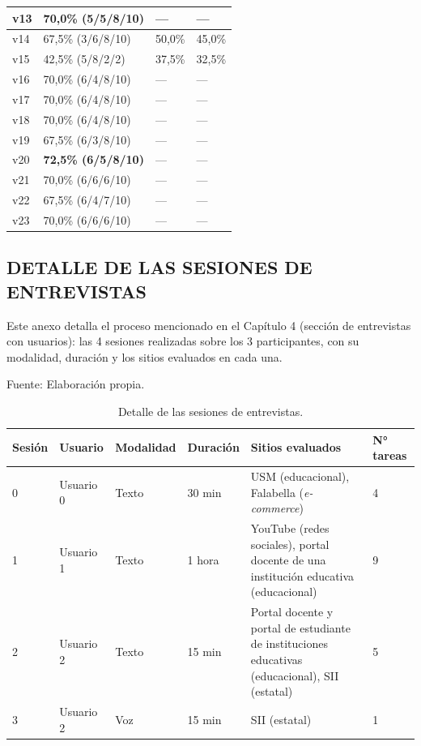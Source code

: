 \begin{longtable}{|p{1.5cm}|p{5cm}|p{2.8cm}|p{2.8cm}|}
    \hline
    v13 & 70,0\% (5/5/8/10) & — & — \\
    \hline
    v14 & 67,5\% (3/6/8/10) & 50,0\% & 45,0\% \\
    \hline
    v15 & 42,5\% (5/8/2/2) & 37,5\% & 32,5\% \\
    \hline
    v16 & 70,0\% (6/4/8/10) & — & — \\
    \hline
    v17 & 70,0\% (6/4/8/10) & — & — \\
    \hline
    v18 & 70,0\% (6/4/8/10) & — & — \\
    \hline
    v19 & 67,5\% (6/3/8/10) & — & — \\
    \hline
    v20 & \textbf{72,5\% (6/5/8/10)} & — & — \\
    \hline
    v21 & 70,0\% (6/6/6/10) & — & — \\
    \hline
    v22 & 67,5\% (6/4/7/10) & — & — \\
    \hline
    v23 & 70,0\% (6/6/6/10) & — & — \\
    \hline
\end{longtable}

\subsection{DETALLE DE LAS SESIONES DE ENTREVISTAS}
\label{anexo:sesiones}

Este anexo detalla el proceso mencionado en el Capítulo 4 (sección de entrevistas con usuarios): las 4 sesiones realizadas sobre los 3 participantes, con su modalidad, duración y los sitios evaluados en cada una.

\begin{table}[h]
    \centering
    \caption{\label{table:detallesesiones} Detalle de las sesiones de entrevistas.} Fuente: Elaboración propia.
    \begin{tabular}{|p{1.15cm}|p{1.8cm}|p{1.9cm}|p{1.6cm}|p{4.75cm}|p{1.4cm}|}
        \hline
        \textbf{Sesión} & \textbf{Usuario} & \textbf{Modalidad} & \textbf{Duración} & \textbf{Sitios evaluados} & \textbf{N° tareas} \\
        \hline
        0 & Usuario 0 & Texto & 30 min & USM (educacional), Falabella (\textit{e-commerce}) & 4 \\
        \hline
        1 & Usuario 1 & Texto & 1 hora & YouTube (redes sociales), portal docente de una institución educativa (educacional) & 9 \\
        \hline
        2 & Usuario 2 & Texto & 15 min & Portal docente y portal de estudiante de instituciones educativas (educacional), SII (estatal) & 5 \\
        \hline
        3 & Usuario 2 & Voz & 15 min & SII (estatal) & 1 \\
        \hline
    \end{tabular}
\end{table}

